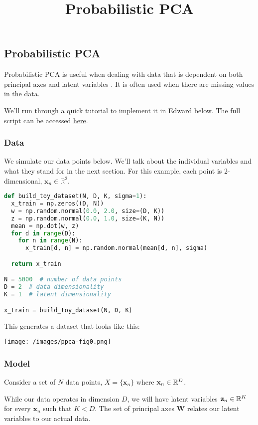 \newcommand{\R}{ \mbox{${\Bbb R}$}}


\title{Probabilistic PCA}

\subsection{Probabilistic PCA}

Probabilistic PCA is useful when dealing with data that is dependent on both principal axes and latent variables \citep{tipping1999probabilistic}. It is often used when there are missing values in the data.

We'll run through a quick tutorial to implement it in Edward below. The full script can be accessed
\href{https://github.com/blei-lab/edward/blob/master/examples/probabilistic_pca.py}
{here}.

\subsubsection{Data}

We simulate our data points below. We'll talk about the individual variables and what they stand for in the next section. For this example, each point is 2-dimensional, $\mathbf{x}_n\in\mathbb{R}^2$.
\begin{lstlisting}[language=Python]
def build_toy_dataset(N, D, K, sigma=1):
  x_train = np.zeros((D, N))
  w = np.random.normal(0.0, 2.0, size=(D, K))
  z = np.random.normal(0.0, 1.0, size=(K, N))
  mean = np.dot(w, z)
  for d in range(D):
    for n in range(N):
      x_train[d, n] = np.random.normal(mean[d, n], sigma)

  return x_train

N = 5000  # number of data points
D = 2  # data dimensionality
K = 1  # latent dimensionality

x_train = build_toy_dataset(N, D, K)
\end{lstlisting}

This generates a dataset that looks like this:

\texttt{[image: /images/ppca-fig0.png]}

\subsubsection{Model}

Consider a set of $N$ data points, $X = \{\mathbf{x}_n\}$ where $\mathbf{x}_n \in \Bbb{R}^D$.

While our data operates in dimension $D$, we will have latent variables $\mathbf{z}_n \in \Bbb{R}^K$ for every $\mathbf{x}_n$ such that $K < D$. The set of principal axes $\mathbf{W}$ relates our latent variables to our actual data.

